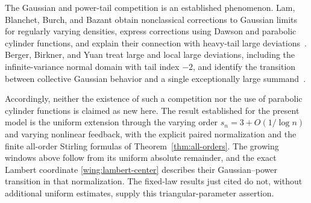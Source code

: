 The Gaussian and power-tail competition is an established phenomenon.
Lam, Blanchet, Burch, and Bazant obtain nonclassical corrections to
Gaussian limits for regularly varying densities, express corrections
using Dawson and parabolic cylinder functions, and explain their
connection with heavy-tail large deviations~\cite{lam}.
Berger, Birkner, and Yuan treat large and local large deviations,
including the infinite-variance normal domain with tail index $-2$,
and identify the transition between collective Gaussian behavior and
a single exceptionally large summand~\cite{berger}.

Accordingly, neither the existence of such a competition nor the use
of parabolic cylinder functions is claimed as new here.  The result
established for the present model is the uniform extension through the
varying order $s_n=3+O(1/\log n)$ and varying nonlinear feedback,
with the explicit paired normalization and the finite all-order
Stirling formulas of Theorem~\ref{thm:all-orders}.  The growing windows
above follow from its uniform absolute remainder, and the exact
Lambert coordinate \eqref{wing:lambert-center} describes their
Gaussian--power transition in that normalization.  The fixed-law
results just cited do not, without additional uniform estimates,
supply this triangular-parameter assertion.
